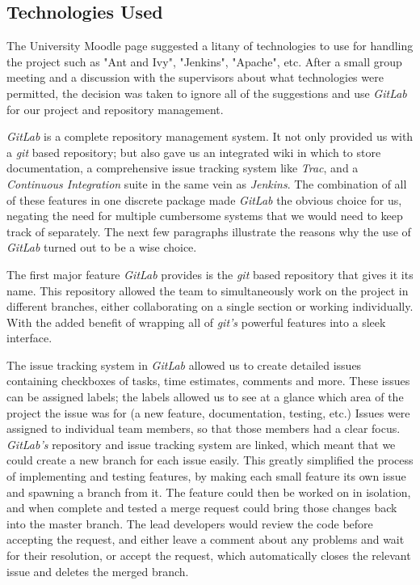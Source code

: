 \documentclass{l3proj}
\begin{document}
\subsection{Technologies Used}
\label{sec:tech}

The University Moodle page suggested a litany of technologies  to use for handling the project such as "Ant and Ivy", "Jenkins", "Apache", etc. After a small group meeting and a discussion with the supervisors about what technologies were permitted, the decision was taken to ignore all of the suggestions and use \textit{GitLab} \cite{gitlab-about} for our project and repository management.

\textit{GitLab} is a complete repository management system. It not only provided us with a \textit{git} based repository; but also gave us an integrated wiki in which to store documentation, a comprehensive issue tracking system like \textit{Trac}, and a \textit{Continuous Integration} suite in the same vein as \textit{Jenkins}. The combination of all of these features in one discrete package made \textit{GitLab} the obvious choice for us, negating the need for multiple cumbersome systems that we would need to keep track of separately. The next few paragraphs illustrate the reasons why the use of \textit{GitLab} turned out to be a wise choice.

The first major feature \textit{GitLab} provides is the \textit{git} based repository that gives it its name. This repository allowed the team to simultaneously work on the project in different branches, either collaborating on a single section or working individually. With the added benefit of wrapping all of \textit{git's} powerful features into a sleek interface.

The issue tracking system in \textit{GitLab} allowed us to create detailed issues containing checkboxes of tasks, time estimates, comments and more. These issues can be assigned labels; the labels allowed us to see at a glance which area of the project the issue was for (a new feature, documentation, testing, etc.) Issues were assigned to individual team members, so that those members had a clear focus. \textit{GitLab's} repository and issue tracking system are linked, which meant that we could create a new branch for each issue easily. This greatly simplified the process of implementing and testing features, by making each small feature its own issue and spawning a branch from it. The feature could then be worked on in isolation, and when complete and tested a merge request could bring those changes back into the master branch. The lead developers would review the code before accepting the request, and either leave a comment about any problems and wait for their resolution, or accept the request, which automatically closes the relevant issue and deletes the merged branch.
\end{document}
